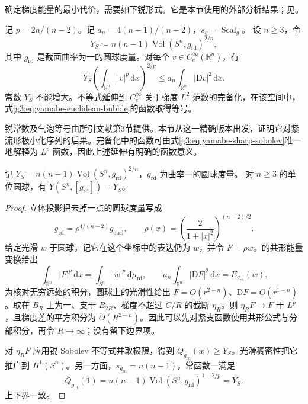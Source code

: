 确定梯度能量的最小代价，需要如下锐形式。它是本节使用的外部分析结果；见\cite[定理3.3，第50页]{LeeParker1987Yamabe}。
\begin{theorem}\label{g3:thm:yamabe-sharp-euclidean}
	记 \(p=2n/(n-2)\)。记 \(a_n=4(n-1)/(n-2)\)，\(s_g=\operatorname{Scal}_g\)。
	设 \(n\ge3\)，令
	\[
		Y_S\coloneqq n(n-1)\operatorname{Vol}(S^n,g_{\mathrm{rd}})^{2/n},
	\]
	其中 \(g_{\mathrm{rd}}\) 是截面曲率为一的圆球度量。对每个 \(v\in C_c^\infty(\mathbb R^n)\)，有
	\begin{equation}\label{g3:eq:yamabe-sharp-sobolev}
		Y_S\left(\int_{\mathbb R^n}|v|^p\,\mathrm dx\right)^{2/p}
		\le a_n\int_{\mathbb R^n}|\mathrm Dv|^2\,\mathrm dx.
	\end{equation}
	常数 \(Y_S\) 不能增大。不等式延伸到 \(C_c^\infty\) 关于梯度 \(L^2\) 范数的完备化，在该空间中，式\eqref{g3:eq:yamabe-euclidean-bubble}的函数取得等号。
\end{theorem}
锐常数及气泡等号由所引文献第3节提供。本节从这一精确版本出发，证明它对紧流形极小化序列的后果。完备化中的函数可由式\eqref{g3:eq:yamabe-sharp-sobolev}唯一地解释为 \(L^p\) 函数，因此上述延伸有明确的函数意义。

\begin{proposition}\label{g3:prop:yamabe-sphere-constant}
	记 \(Y_S=n(n-1)\operatorname{Vol}(S^n,g_{\mathrm{rd}})^{2/n}\)，\(g_{\mathrm{rd}}\) 为曲率一的圆球度量。
	对 \(n\ge3\) 的单位圆球，有 \(Y(S^n,[g_{\mathrm{rd}}])=Y_S\)。
\end{proposition}
\begin{proof}
	立体投影把去掉一点的圆球度量写成
	\[
		g_{\mathrm{rd}}=\rho^{4/(n-2)}g_{\mathrm{eucl}},\qquad
		\rho(x)=\left(\frac{2}{1+|x|^2}\right)^{(n-2)/2}.
	\]
	给定光滑 \(w\) 于圆球，记它在这个坐标中的表达仍为 \(w\)，并令 \(F=\rho w\)。的共形能量变换给出
	\[
		\int_{\mathbb R^n}|F|^p\,\mathrm dx
		=\int_{S^n}|w|^p\,\mathrm d\mu_{\mathrm{rd}},
		\qquad
		a_n\int_{\mathbb R^n}|\mathrm DF|^2\,\mathrm dx=E_{g_{\mathrm{rd}}}(w).
	\]
	为核对无穷远处的积分，圆球上的光滑性给出 \(F=O(r^{2-n})\)、\(\mathrm DF=O(r^{1-n})\)。取在 \(B_R\) 上为一、支于 \(B_{2R}\)、梯度不超过 \(C/R\) 的截断 \(\eta_R\)。则 \(\eta_RF\to F\) 于 \(L^p\)，且梯度差的平方积分为 \(O(R^{2-n})\)。因此可以先对紧支函数使用共形公式与分部积分，再令 \(R\to\infty\)；没有留下边界项。

	对 \(\eta_RF\) 应用锐 Sobolev 不等式并取极限，得到 \(Q_{g_{\mathrm{rd}}}(w)\ge Y_S\)。光滑稠密性把它推广到 \(H^1(S^n)\)。另一方面，\(s_{g_{\mathrm{rd}}}=n(n-1)\)，常函数一满足
	\[
		Q_{g_{\mathrm{rd}}}(1)
		=n(n-1)\operatorname{Vol}(S^n,g_{\mathrm{rd}})^{1-2/p}=Y_S.
	\]
	上下界一致。
\end{proof}

